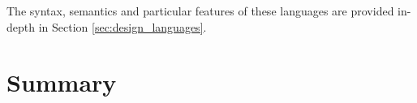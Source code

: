 \documentclass[a4paper,12pt,twoside,openright]{report}
\begin{document}
The syntax, semantics and particular features of these languages are provided
in-depth in Section \ref{sec:design_languages}.
















\section{Summary}
\end{document}
